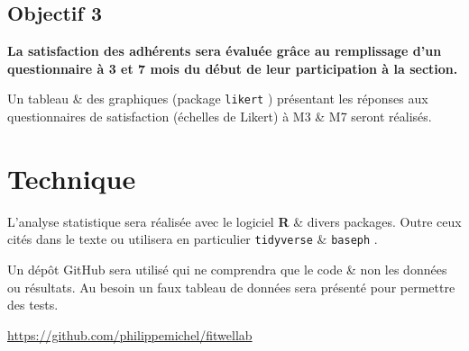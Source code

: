 \documentclass[
  a4paper,
  french,
  fontsize=10pt,
  oneside]{scrartcl}
\begin{document}
\hypertarget{objectif-3}{%
\subsection{Objectif 3}\label{objectif-3}}

\textbf{La satisfaction des adhérents sera évaluée grâce au remplissage
d'un questionnaire à 3 et 7 mois du début de leur participation à la
section.}

Un tableau \& des graphiques (package \texttt{likert}
\autocite{lik})
présentant les réponses aux questionnaires de satisfaction (échelles de
Likert) à M3 \& M7 seront réalisés.

\hypertarget{technique}{%
\section{Technique}\label{technique}}

L'analyse statistique sera réalisée avec le logiciel
\textbf{R}\autocite{rstat}
\& divers packages. Outre ceux cités dans le texte ou utilisera en
particulier \texttt{tidyverse}
\autocite{tidy}
\& \texttt{baseph}
\autocite{baseph}.

Un dépôt GitHub sera utilisé qui ne comprendra que le code \& non les
données ou résultats. Au besoin un faux tableau de données sera présenté
pour permettre des tests.

\url{https://github.com/philippemichel/fitwellab}
\end{document}
